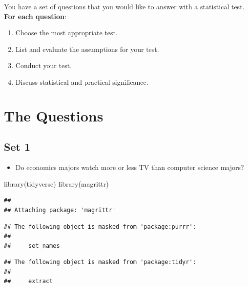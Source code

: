 \documentclass[
]{book}
\newenvironment{Shaded}{\begin{snugshade}}{\end{snugshade}}
\newcommand{\FunctionTok}[1]{\textcolor[rgb]{0.00,0.00,0.00}{#1}}
\newcommand{\NormalTok}[1]{#1}
\newcommand{\SpecialCharTok}[1]{\textcolor[rgb]{0.00,0.00,0.00}{#1}}
\newcommand{\StringTok}[1]{\textcolor[rgb]{0.31,0.60,0.02}{#1}}
\providecommand{\tightlist}{%
  \setlength{\itemsep}{0pt}\setlength{\parskip}{0pt}}
\theoremstyle{definition}
\theoremstyle{definition}
\theoremstyle{definition}
\theoremstyle{definition}
\theoremstyle{remark}
\begin{document}
You have a set of questions that you would like to answer with a statistical test. \textbf{For each question}:

\begin{enumerate}
\def\labelenumi{\arabic{enumi}.}
\tightlist
\item
  Choose the most appropriate test.
\item
  List and evaluate the assumptions for your test.
\item
  Conduct your test.
\item
  Discuss statistical and practical significance.
\end{enumerate}

\hypertarget{the-questions}{%
\section{The Questions}\label{the-questions}}

\hypertarget{set-1}{%
\subsection{Set 1}\label{set-1}}

\begin{itemize}
\tightlist
\item
  Do economics majors watch more or less TV than computer science majors?
\end{itemize}

\begin{Shaded}
\begin{Highlighting}[]
\FunctionTok{library}\NormalTok{(tidyverse)}
\FunctionTok{library}\NormalTok{(magrittr)}
\end{Highlighting}
\end{Shaded}

\begin{verbatim}
## 
## Attaching package: 'magrittr'
\end{verbatim}

\begin{verbatim}
## The following object is masked from 'package:purrr':
## 
##     set_names
\end{verbatim}

\begin{verbatim}
## The following object is masked from 'package:tidyr':
## 
##     extract
\end{verbatim}

\begin{Shaded}
\end{Shaded}
\end{document}
